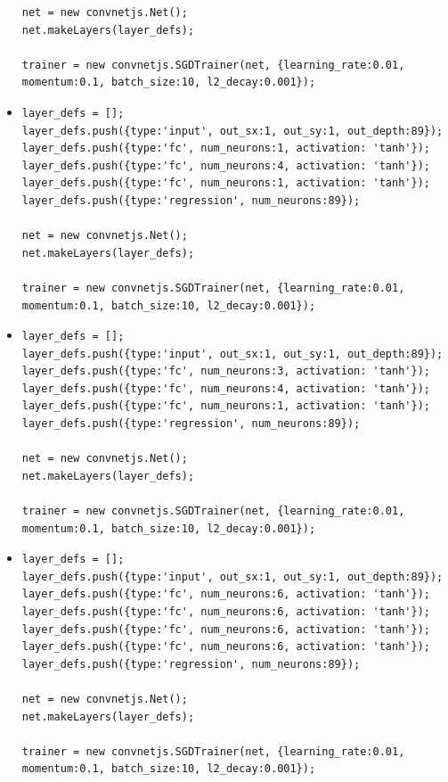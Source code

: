 \begin{itemize}
\begin{verbatim}
net = new convnetjs.Net();
net.makeLayers(layer_defs);

trainer = new convnetjs.SGDTrainer(net, {learning_rate:0.01,
momentum:0.1, batch_size:10, l2_decay:0.001});
\end{verbatim}


\item \begin{verbatim}
layer_defs = [];
layer_defs.push({type:'input', out_sx:1, out_sy:1, out_depth:89});
layer_defs.push({type:'fc', num_neurons:1, activation: 'tanh'});
layer_defs.push({type:'fc', num_neurons:4, activation: 'tanh'});
layer_defs.push({type:'fc', num_neurons:1, activation: 'tanh'});
layer_defs.push({type:'regression', num_neurons:89});

net = new convnetjs.Net();
net.makeLayers(layer_defs);

trainer = new convnetjs.SGDTrainer(net, {learning_rate:0.01, 
momentum:0.1, batch_size:10, l2_decay:0.001});
\end{verbatim}

\item \begin{verbatim}
layer_defs = [];
layer_defs.push({type:'input', out_sx:1, out_sy:1, out_depth:89});
layer_defs.push({type:'fc', num_neurons:3, activation: 'tanh'});
layer_defs.push({type:'fc', num_neurons:4, activation: 'tanh'});
layer_defs.push({type:'fc', num_neurons:1, activation: 'tanh'});
layer_defs.push({type:'regression', num_neurons:89});

net = new convnetjs.Net();
net.makeLayers(layer_defs);

trainer = new convnetjs.SGDTrainer(net, {learning_rate:0.01, 
momentum:0.1, batch_size:10, l2_decay:0.001});
\end{verbatim}


\item \begin{verbatim}
layer_defs = [];
layer_defs.push({type:'input', out_sx:1, out_sy:1, out_depth:89});
layer_defs.push({type:'fc', num_neurons:6, activation: 'tanh'});
layer_defs.push({type:'fc', num_neurons:6, activation: 'tanh'});
layer_defs.push({type:'fc', num_neurons:6, activation: 'tanh'});
layer_defs.push({type:'fc', num_neurons:6, activation: 'tanh'});
layer_defs.push({type:'regression', num_neurons:89});

net = new convnetjs.Net();
net.makeLayers(layer_defs);

trainer = new convnetjs.SGDTrainer(net, {learning_rate:0.01, 
momentum:0.1, batch_size:10, l2_decay:0.001});
\end{verbatim}


\end{itemize}
